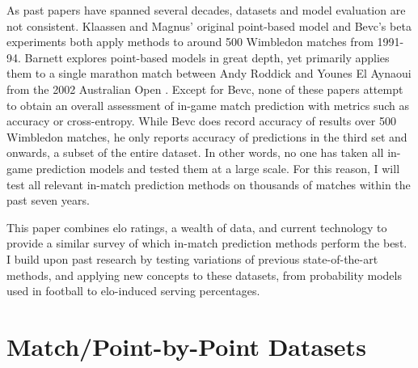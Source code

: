 \documentclass[chapterprefix=false]{report}
\begin{document}
As past papers have spanned several decades, datasets and model evaluation are not consistent. Klaassen and Magnus' original point-based model and Bevc's beta experiments both apply methods to around 500 Wimbledon matches from 1991-94. Barnett explores point-based models in great depth, yet primarily applies them to a single marathon match between Andy Roddick and Younes El Aynaoui from the 2002 Australian Open \cite{Barnett2006}. Except for Bevc, none of these papers attempt to obtain an overall assessment of in-game match prediction with metrics such as accuracy or cross-entropy. While Bevc does record accuracy of results over 500 Wimbledon matches, he only reports accuracy of predictions in the third set and onwards, a subset of the entire dataset. In other words, no one has taken all in-game prediction models and tested them at a large scale. For this reason, I will test all relevant in-match prediction methods on thousands of matches within the past seven years.


This paper combines elo ratings, a wealth of data, and current technology to provide a similar survey of which in-match prediction methods perform the best. I build upon past research by testing variations of previous state-of-the-art methods, and applying new concepts to these datasets, from probability models used in football to elo-induced serving percentages.


 
\section{Match/Point-by-Point Datasets}
 
\end{document}
